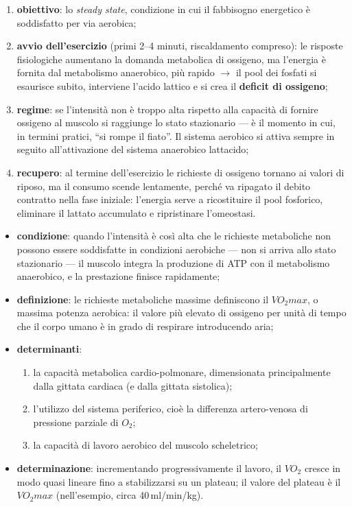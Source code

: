 \begin{enumerate}
  \item \textbf{obiettivo}: lo \textit{steady state}, condizione in cui il fabbisogno energetico è
    soddisfatto per via aerobica;
  \item \textbf{avvio dell'esercizio} (primi 2--4 minuti, riscaldamento compreso): le risposte
    fisiologiche aumentano la domanda metabolica di ossigeno, ma l'energia è fornita dal metabolismo
    anaerobico, più rapido $\rightarrow$ il pool dei fosfati si esaurisce subito, interviene l'acido
    lattico e si crea il \textbf{deficit di ossigeno};
  \item \textbf{regime}: se l'intensità non è troppo alta rispetto alla capacità di fornire ossigeno
    al muscolo si raggiunge lo stato stazionario --- è il momento in cui, in termini pratici, ``si
    rompe il fiato''. Il sistema aerobico si attiva sempre in seguito all'attivazione del sistema
    anaerobico lattacido;
  \item \textbf{recupero}: al termine dell'esercizio le richieste di ossigeno tornano ai valori di
    riposo, ma il consumo scende lentamente, perché va ripagato il debito contratto nella fase
    iniziale: l'energia serve a ricostituire il pool fosforico, eliminare il lattato accumulato e
    ripristinare l'omeostasi.
\end{enumerate}

\begin{itemize}
  \item \textbf{condizione}: quando l'intensità è così alta che le richieste metaboliche non possono
    essere soddisfatte in condizioni aerobiche --- non si arriva allo stato stazionario --- il
    muscolo integra la produzione di ATP con il metabolismo anaerobico, e la prestazione finisce
    rapidamente;
  \item \textbf{definizione}: le richieste metaboliche massime definiscono il $VO_2max$, o massima
    potenza aerobica: il valore più elevato di ossigeno per unità di tempo che il corpo umano è in
    grado di respirare introducendo aria;
  \item \textbf{determinanti}:
    \begin{enumerate}
      \item la capacità metabolica cardio-polmonare, dimensionata principalmente dalla gittata
        cardiaca (e dalla gittata sistolica);
      \item l'utilizzo del sistema periferico, cioè la differenza artero-venosa di pressione
        parziale di $O_2$;
      \item la capacità di lavoro aerobico del muscolo scheletrico;
    \end{enumerate}
  \item \textbf{determinazione}: incrementando progressivamente il lavoro, il $VO_2$ cresce in modo
    quasi lineare fino a stabilizzarsi su un plateau; il valore del plateau è il $VO_2max$
    (nell'esempio, circa 40\,ml/min/kg).
\end{itemize}

